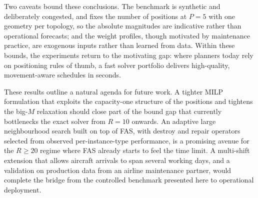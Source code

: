 Two caveats bound these conclusions.  The benchmark is synthetic and
deliberately congested, and fixes the number of positions at $P=5$ with
one geometry per topology, so the absolute magnitudes are indicative
rather than operational forecasts; and the weight profiles, though
motivated by maintenance practice, are exogenous inputs rather than
learned from data.  Within these bounds, the experiments return to the
motivating gap: where planners today rely on positioning rules of thumb,
a fast solver portfolio delivers high-quality, movement-aware schedules
in seconds.

These results outline a natural agenda for future work.  A tighter MILP
formulation that exploits the capacity-one structure of the positions
and tightens the big-$M$ relaxation should close part of the bound gap
that currently bottlenecks the exact solver from $R{=}10$ onwards.  An
adaptive large neighbourhood search built on top of FAS, with destroy
and repair operators selected from observed per-instance-type
performance, is a promising avenue for the $R{\ge}20$ regime where FAS
already starts to feel the time limit.  A multi-shift extension that
allows aircraft arrivals to span several working days, and a validation
on production data from an airline maintenance partner, would complete
the bridge from the controlled benchmark presented here to operational
deployment.
